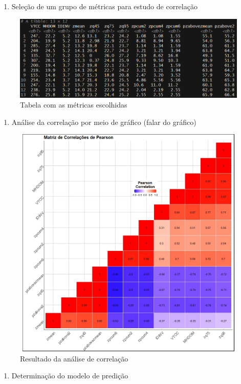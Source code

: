 \documentclass[
]{article}
\providecommand{\tightlist}{%
  \setlength{\itemsep}{0pt}\setlength{\parskip}{0pt}}
\begin{document}
\begin{enumerate}
\def\labelenumi{\arabic{enumi}.}
\setcounter{enumi}{11}
\tightlist
\item
  Seleção de um grupo de métricas para estudo de correlação
\end{enumerate}

\begin{figure}

{\centering \includegraphics[width=0.5\linewidth]{IMAGES/tb-subgrupo-de-metricas-p-analise} 

}

\caption{Tabela com as métricas escolhidas}\label{fig:unnamed-chunk-17}
\end{figure}

\newpage

\begin{enumerate}
\def\labelenumi{\arabic{enumi}.}
\setcounter{enumi}{12}
\tightlist
\item
  Análise da correlação por meio de gráfico (falar do gráfico)
\end{enumerate}

\begin{figure}

{\centering \includegraphics[width=0.5\linewidth]{IMAGES/MatrizDeCorrelacoes} 

}

\caption{Resultado da análise de correlação}\label{fig:unnamed-chunk-18}
\end{figure}

\newpage

\begin{enumerate}
\def\labelenumi{\arabic{enumi}.}
\setcounter{enumi}{13}
\tightlist
\item
  Determinação do modelo de predição
\end{enumerate}
\end{document}
